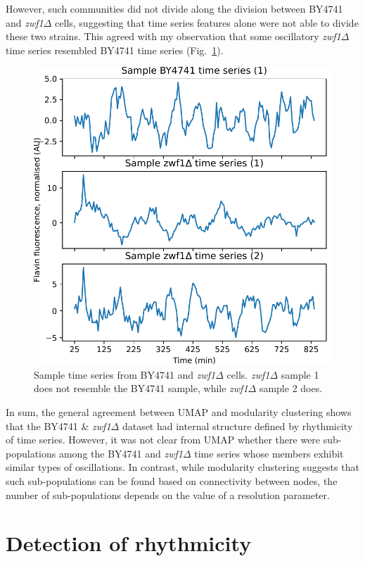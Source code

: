 However, such communities did not divide along the division between BY4741 and \textit{zwf1$\Delta$} cells, suggesting that time series features alone were not able to divide these two strains.
This agreed with my observation that some oscillatory \textit{zwf1$\Delta$} time series resembled BY4741 time series (Fig.\ \ref{fig:analysis-sample-zwf1}).

\begin{figure}[hb!]
  \centering
  \includegraphics[width=0.6\linewidth]{sample_ts_zwf1.pdf}

  \caption[
    Sample time series from BY4741 and \textit{zwf1$\Delta$} cells.
  ]{
    Sample time series from BY4741 and \textit{zwf1$\Delta$} cells.
    \textit{zwf1$\Delta$} sample 1 does not resemble the BY4741 sample, while \textit{zwf1$\Delta$} sample 2 does.
  }
  \label{fig:analysis-sample-zwf1}
\end{figure}


In sum, the general agreement between UMAP and modularity clustering shows that the BY4741 \& \textit{zwf1$\Delta$} dataset had internal structure defined by rhythmicity of time series.
However, it was not clear from UMAP whether there were sub-populations among the BY4741 and \textit{zwf1$\Delta$} time series whose members exhibit similar types of oscillations.
In contrast, while modularity clustering suggests that such sub-populations can be found based on connectivity between nodes, the number of sub-populations depends on the value of a resolution parameter.


\section{Detection of rhythmicity}
\label{sec:analysis-classification}

